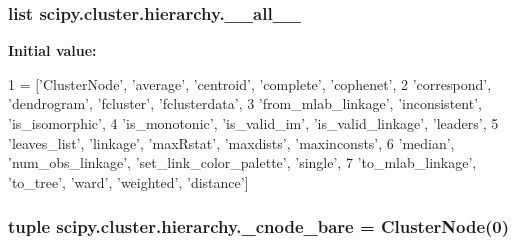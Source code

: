 \subsubsection[{\+\_\+\+\_\+all\+\_\+\+\_\+}]{\setlength{\rightskip}{0pt plus 5cm}list scipy.\+cluster.\+hierarchy.\+\_\+\+\_\+all\+\_\+\+\_\+}\label{namespacescipy_1_1cluster_1_1hierarchy_a41e5f5137979cd0a60b16d1f0853b6c4}
{\bfseries Initial value\+:}
\begin{DoxyCode}
1 = [\textcolor{stringliteral}{'ClusterNode'}, \textcolor{stringliteral}{'average'}, \textcolor{stringliteral}{'centroid'}, \textcolor{stringliteral}{'complete'}, \textcolor{stringliteral}{'cophenet'},
2            \textcolor{stringliteral}{'correspond'}, \textcolor{stringliteral}{'dendrogram'}, \textcolor{stringliteral}{'fcluster'}, \textcolor{stringliteral}{'fclusterdata'},
3            \textcolor{stringliteral}{'from\_mlab\_linkage'}, \textcolor{stringliteral}{'inconsistent'}, \textcolor{stringliteral}{'is\_isomorphic'},
4            \textcolor{stringliteral}{'is\_monotonic'}, \textcolor{stringliteral}{'is\_valid\_im'}, \textcolor{stringliteral}{'is\_valid\_linkage'}, \textcolor{stringliteral}{'leaders'},
5            \textcolor{stringliteral}{'leaves\_list'}, \textcolor{stringliteral}{'linkage'}, \textcolor{stringliteral}{'maxRstat'}, \textcolor{stringliteral}{'maxdists'}, \textcolor{stringliteral}{'maxinconsts'},
6            \textcolor{stringliteral}{'median'}, \textcolor{stringliteral}{'num\_obs\_linkage'}, \textcolor{stringliteral}{'set\_link\_color\_palette'}, \textcolor{stringliteral}{'single'},
7            \textcolor{stringliteral}{'to\_mlab\_linkage'}, \textcolor{stringliteral}{'to\_tree'}, \textcolor{stringliteral}{'ward'}, \textcolor{stringliteral}{'weighted'}, \textcolor{stringliteral}{'distance'}]
\end{DoxyCode}
\hypertarget{namespacescipy_1_1cluster_1_1hierarchy_a790a0a5417c572c81331a31bfc6d2150}{}
\subsubsection[{\+\_\+cnode\+\_\+bare}]{\setlength{\rightskip}{0pt plus 5cm}tuple scipy.\+cluster.\+hierarchy.\+\_\+cnode\+\_\+bare = {\bf Cluster\+Node}(0)}\label{namespacescipy_1_1cluster_1_1hierarchy_a790a0a5417c572c81331a31bfc6d2150}
\hypertarget{namespacescipy_1_1cluster_1_1hierarchy_a28abe10552adf386e64235999e2c5c05}{}
